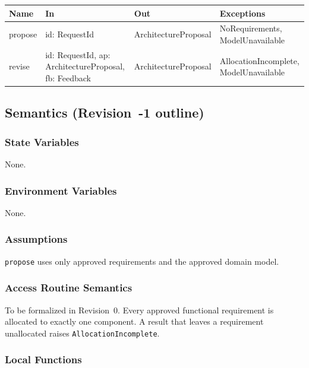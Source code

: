 \documentclass[12pt, titlepage]{article}
\begin{document}
\begin{center}
\small
\begin{tabular}{>{\raggedright\arraybackslash}p{3.7cm} >{\raggedright\arraybackslash}p{3.8cm} >{\raggedright\arraybackslash}p{3.6cm} >{\raggedright\arraybackslash}p{3.7cm}}
\hline
\textbf{Name} & \textbf{In} & \textbf{Out} & \textbf{Exceptions} \\
\hline
propose & id: RequestId & ArchitectureProposal & NoRequirements, ModelUnavailable \\
revise & id: RequestId, ap: ArchitectureProposal, fb: Feedback & ArchitectureProposal & AllocationIncomplete, ModelUnavailable \\
\hline
\end{tabular}
\end{center}

\subsection{Semantics (Revision~-1 outline)}

\subsubsection{State Variables}

None.

\subsubsection{Environment Variables}

None.

\subsubsection{Assumptions}

\texttt{propose} uses only approved requirements and the approved domain
model.

\subsubsection{Access Routine Semantics}

To be formalized in Revision~0. Every approved functional requirement is
allocated to exactly one component. A result that leaves a requirement
unallocated raises \texttt{AllocationIncomplete}.

\subsubsection{Local Functions}
\end{document}

